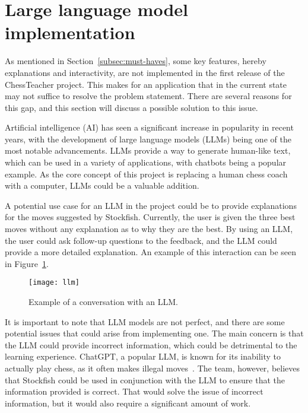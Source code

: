 \section{Large language model implementation}\label{sec:large-language-model-implementation}

As mentioned in Section~\ref{subsec:must-haves}, some key features, hereby explanations and interactivity, are not
implemented in the first release of the ChessTeacher project.
This makes for an application that in the current state may not suffice to resolve the problem statement.
There are several reasons for this gap, and this section will discuss a possible solution to this issue.

Artificial intelligence (AI) has seen a significant increase in popularity in recent years, with the development of
large language models (LLMs) being one of the most notable advancements.
LLMs provide a way to generate human-like text, which can be used in a variety of applications, with chatbots being a
popular example.
As the core concept of this project is replacing a human chess coach with a computer, LLMs could be a valuable addition.

A potential use case for an LLM in the project could be to provide explanations for the moves suggested by Stockfish.
Currently, the user is given the three best moves without any explanation as to why they are the best.
By using an LLM, the user could ask follow-up questions to the feedback, and the LLM could provide a more detailed
explanation.
An example of this interaction can be seen in Figure~\ref{fig:llm}.

\begin{figure}[H]
    \centering
    \texttt{[image: llm]}
    \caption{Example of a conversation with an LLM.}\label{fig:llm}
\end{figure}

It is important to note that LLM models are not perfect, and there are some potential issues that could arise from
implementing one.
The main concern is that the LLM could provide incorrect information, which could be detrimental to the learning
experience.
ChatGPT, a popular LLM, is known for its inability to actually play chess, as it often makes illegal
moves~\cite{llm-chess}.
The team, however, believes that Stockfish could be used in conjunction with the LLM to ensure that the information
provided is correct.
That would solve the issue of incorrect information, but it would also require a significant amount of work.

